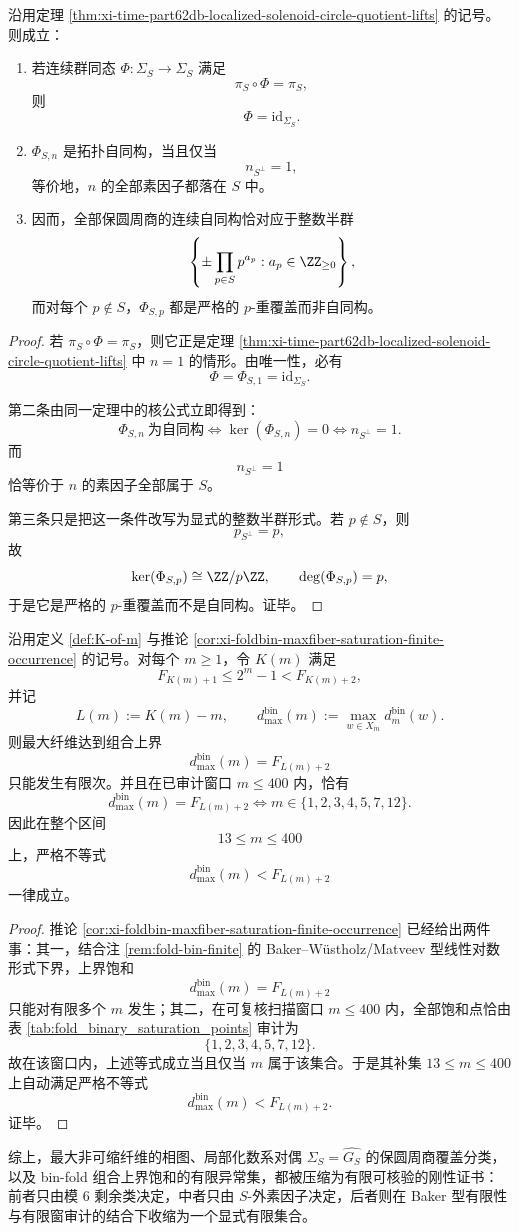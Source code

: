 \begin{corollary}\label{cor:xi-time-part62db-localized-solenoid-circle-quotient-rigidity}
沿用定理 \ref{thm:xi-time-part62db-localized-solenoid-circle-quotient-lifts} 的记号。则成立：
\begin{enumerate}
  \item 若连续群同态 \(\Phi:\Sigma_S\to\Sigma_S\) 满足
  \[
  \pi_S\circ \Phi=\pi_S,
  \]
  则
  \[
  \Phi=\mathrm{id}_{\Sigma_S}.
  \]
  \item \(\Phi_{S,n}\) 是拓扑自同构，当且仅当
  \[
  n_{S^\perp}=1,
  \]
  等价地，\(n\) 的全部素因子都落在 \(S\) 中。
  \item 因而，全部保圆周商的连续自同构恰对应于整数半群
  \[
  \left\{
  \pm\prod_{p\in S}p^{a_p}: a_p\in\ZZ_{\ge 0}
  \right\},
  \]
  而对每个 \(p\notin S\)，\(\Phi_{S,p}\) 都是严格的 \(p\)-重覆盖而非自同构。
\end{enumerate}
\end{corollary}
\begin{proof}
若 \(\pi_S\circ \Phi=\pi_S\)，则它正是定理 \ref{thm:xi-time-part62db-localized-solenoid-circle-quotient-lifts} 中 \(n=1\) 的情形。由唯一性，必有
\[
\Phi=\Phi_{S,1}=\mathrm{id}_{\Sigma_S}.
\]

第二条由同一定理中的核公式立即得到：
\[
\Phi_{S,n}\ \text{为自同构}
\iff
\ker(\Phi_{S,n})=0
\iff
n_{S^\perp}=1.
\]
而
\[
n_{S^\perp}=1
\]
恰等价于 \(n\) 的素因子全部属于 \(S\)。

第三条只是把这一条件改写为显式的整数半群形式。若 \(p\notin S\)，则
\[
p_{S^\perp}=p,
\]
故
\[
\ker(\Phi_{S,p})\cong \ZZ/p\ZZ,
\qquad
\deg(\Phi_{S,p})=p,
\]
于是它是严格的 \(p\)-重覆盖而不是自同构。证毕。
\end{proof}

\begin{proposition}\label{prop:xi-time-part62db-binfold-saturation-audited-finite-list}
沿用定义 \ref{def:K-of-m} 与推论 \ref{cor:xi-foldbin-maxfiber-saturation-finite-occurrence} 的记号。对每个 \(m\ge 1\)，令 \(K(m)\) 满足
\[
F_{K(m)+1}\le 2^m-1<F_{K(m)+2},
\]
并记
\[
L(m):=K(m)-m,
\qquad
d_{\max}^{\mathrm{bin}}(m):=\max_{w\in X_m}d_m^{\mathrm{bin}}(w).
\]
则最大纤维达到组合上界
\[
d_{\max}^{\mathrm{bin}}(m)=F_{L(m)+2}
\]
只能发生有限次。并且在已审计窗口 \(m\le 400\) 内，恰有
\[
d_{\max}^{\mathrm{bin}}(m)=F_{L(m)+2}
\iff
m\in\{1,2,3,4,5,7,12\}.
\]
因此在整个区间
\[
13\le m\le 400
\]
上，严格不等式
\[
d_{\max}^{\mathrm{bin}}(m)<F_{L(m)+2}
\]
一律成立。
\end{proposition}
\begin{proof}
推论 \ref{cor:xi-foldbin-maxfiber-saturation-finite-occurrence} 已经给出两件事：其一，结合注 \ref{rem:fold-bin-finite} 的 Baker--W\"ustholz/Matveev 型线性对数形式下界，上界饱和
\[
d_{\max}^{\mathrm{bin}}(m)=F_{L(m)+2}
\]
只能对有限多个 \(m\) 发生；其二，在可复核扫描窗口 \(m\le 400\) 内，全部饱和点恰由表 \ref{tab:fold_binary_saturation_points} 审计为
\[
\{1,2,3,4,5,7,12\}.
\]
故在该窗口内，上述等式成立当且仅当 \(m\) 属于该集合。于是其补集 \(13\le m\le 400\) 上自动满足严格不等式
\[
d_{\max}^{\mathrm{bin}}(m)<F_{L(m)+2}.
\]
证毕。
\end{proof}

\noindent
综上，最大非可缩纤维的相图、局部化数系对偶 \(\Sigma_S=\widehat{G_S}\) 的保圆周商覆盖分类，以及 bin-fold 组合上界饱和的有限异常集，都被压缩为有限可核验的刚性证书：前者只由模 \(6\) 剩余类决定，中者只由 \(S\)-外素因子决定，后者则在 Baker 型有限性与有限窗审计的结合下收缩为一个显式有限集合。

\endinput
